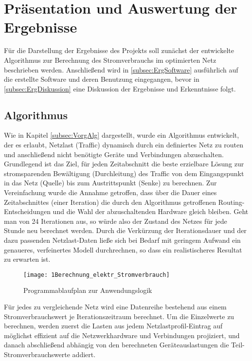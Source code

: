 
\section{Präsentation und Auswertung der Ergebnisse} \label{sec:Erg}
Für die Darstellung der Ergebnisse des Projekts soll zunächst der entwickelte Algorithmus zur Berechnung des Stromverbrauchs im optimierten Netz beschrieben werden. Anschließend wird in \ref{subsec:ErgSoftware} ausführlich auf die erstellte Software  und deren Benutzung eingegangen, bevor in \ref{subsec:ErgDiskussion} eine Diskussion der Ergebnisse und Erkenntnisse folgt.

\subsection{Algorithmus} \label{subsec:ErgAlg}
Wie in Kapitel \ref{subsec:VorgAlg} dargestellt, wurde ein Algorithmus entwickelt, der es erlaubt, Netzlast (Traffic) dynamisch durch ein definiertes Netz zu routen und anschließend nicht benötigte Geräte und Verbindungen abzuschalten.
Grundlegend ist das Ziel, für jeden Zeitabschnitt die beste erzielbare Lösung zur stromsparenden Bewältigung (Durchleitung) des Traffic von dem Eingangspunkt in das Netz (Quelle) bis zum Austrittspunkt (Senke) zu berechnen. Zur Vereinfachung wurde die Annahme getroffen, dass über die Dauer eines Zeitabschnittes (einer Iteration) die durch den Algorithmus getroffenen Routing-Entscheidungen und die Wahl der abzuschaltenden Hardware gleich bleiben. Geht man von 24 Iterationen aus, so würde also der Zustand des Netzes für jede Stunde neu berechnet werden. Durch die Verkürzung der Iterationsdauer und der dazu passenden Netzlast-Daten ließe sich bei Bedarf mit geringem Aufwand ein genaueres, verfeinertes Modell durchrechnen, so dass ein realistischeres Resultat zu erwarten ist.


\begin{figure}[!ht]
	\centering
	\texttt{[image: 1Berechnung\_elektr\_Stromverbrauch]}
	\caption{Programmablaufplan zur Anwendungslogik}
	\label{fig:1Berechnung_elektr_Stromverbrauch}
\end{figure}


Für jedes zu vergleichende Netz wird eine Datenreihe bestehend aus einem Stromverbrauchswert je Iterationszeitraum berechnet. Um die Einzelwerte zu berechnen, werden zuerst die Lasten aus jedem Netzlastprofil-Eintrag auf möglichst effizient auf die Netzwerkhardware und Verbindungen projiziert, und danach abschließend abhängig von den berechneten Geräteauslastungen die Teil-Stromverbrauchswerte addiert.


